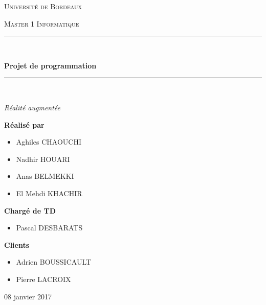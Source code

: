 \documentclass[12pt,a4paper]{article}
\newcommand{\HRule}{\rule{\linewidth}{0.5mm}}
\begin{document}
\begin{titlepage}
\begin{center}

{\scshape\LARGE Université de Bordeaux \par}
{\scshape\Large Master 1 Informatique \par}

\vspace{3cm}
\HRule \\[0.4cm]
{\Huge\bfseries Projet de programmation \par}%
\HRule \\
{\Large\itshape Réalité augmentée \par}
\vspace{3cm}

\begin{minipage}{.46\linewidth}
	\begin{flushleft} \large
    	{\bfseries Réalisé par} \par
    	\begin{itemize}
          \item Aghiles \textsc{CHAOUCHI}
          \item Nadhir \textsc{HOUARI} 
          \item Anas \textsc{BELMEKKI} 
          \item El Mehdi \textsc{KHACHIR}
    	\end{itemize}
	\end{flushleft}
\end{minipage}
\begin{minipage}{.46\linewidth}
	\begin{flushleft} \large
    	{\bfseries Chargé de TD} \par
		\begin{itemize}
      		\item Pascal \textsc{DESBARATS}
    	\end{itemize}
		{\bfseries Clients} \par
         \begin{itemize}
         	\item Adrien \textsc{BOUSSICAULT}
      		\item Pierre \textsc{LACROIX}
    	\end{itemize}
   \end{flushleft}
\end{minipage}
\vfill
\vfill
{\large 08 janvier 2017\par}
\end{center}
\end{titlepage}
\tableofcontents
\newpage
\end{document}
